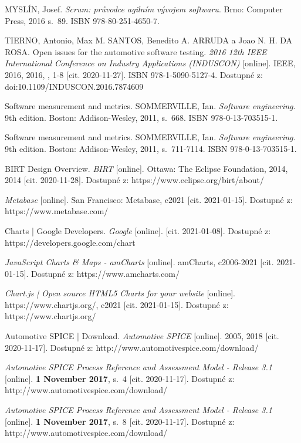 \documentclass[czech,master,public,dept460,male,cpdeclaration,oneside]{diploma}
\begin{document}
\begin{thebibliography}{37}
MYSLÍN, Josef. \textit{Scrum: průvodce agilním vývojem softwaru}. Brno: Computer Press, 2016 s.~89. ISBN 978-80-251-4650-7.

TIERNO, Antonio, Max M. SANTOS, Benedito A. ARRUDA a Joao N. H. DA ROSA. Open issues for the automotive software testing. \textit{2016 12th IEEE International Conference on Industry Applications (INDUSCON)} [online]. IEEE, 2016, 2016, , 1-8 [cit. 2020-11-27]. ISBN 978-1-5090-5127-4. Dostupné z: doi:10.1109/INDUSCON.2016.7874609

Software measurement and metrics. SOMMERVILLE, Ian. \textit{Software engineering}. 9th edition. Boston: Addison-Wesley, 2011, s.~668. ISBN 978-0-13-703515-1.


Software measurement and metrics. SOMMERVILLE, Ian. \textit{Software engineering}. 9th edition. Boston: Addison-Wesley, 2011, s.~711-7114. ISBN 978-0-13-703515-1.

BIRT Design Overview. \textit{BIRT} [online]. Ottawa: The Eclipse Foundation, 2014, 2014 [cit. 2020-11-28]. Dostupné z: https://www.eclipse.org/birt/about/

\textit{Metabase} [online]. San Francisco: Metabase, c2021 [cit. 2021-01-15]. Dostupné z: https://www.metabase.com/

Charts | Google Developers. \textit{Google} [online]. [cit. 2021-01-08]. Dostupné z: https://developers.google.com/chart

\textit{JavaScript Charts \& Maps - amCharts} [online]. amCharts, c2006-2021 [cit. 2021-01-15]. Dostupné z: https://www.amcharts.com/

\textit{Chart.js | Open source HTML5 Charts for your website} [online]. https://www.chartjs.org/, c2021 [cit. 2021-01-15]. Dostupné z: https://www.chartjs.org/

Automotive SPICE | Download. \textit{Automotive SPICE} [online]. 2005, 2018 [cit. 2020-11-17]. Dostupné z: http://www.automotivespice.com/download/

\textit{Automotive SPICE Process Reference and Assessment Model - Release 3.1} [online]. \textbf{1 November 2017}, s.~4 [cit. 2020-11-17]. Dostupné z: http://www.automotivespice.com/download/

\textit{Automotive SPICE Process Reference and Assessment Model - Release 3.1} [online]. \textbf{1 November 2017}, s.~8 [cit. 2020-11-17]. Dostupné z: http://www.automotivespice.com/download/


\end{thebibliography}
\end{document}
